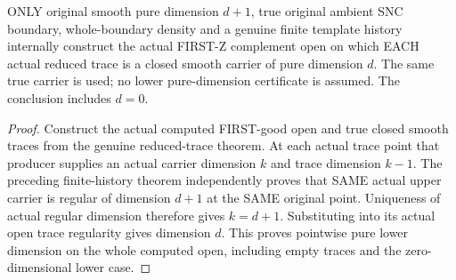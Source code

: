 \begin{theorem}
\label{hir:sharp-original-first-good-trace-pure-lower-dimension}
\leanok
ONLY original smooth pure dimension $d+1$, true original ambient SNC
boundary, whole-boundary density and a genuine finite template history
internally construct the actual FIRST-Z complement open on which EACH
actual reduced trace is a closed smooth carrier of pure dimension $d$.
The same true carrier is used; no lower pure-dimension certificate is
assumed. The conclusion includes $d=0$.
\end{theorem}
\begin{proof}
Construct the actual computed FIRST-good open and true closed smooth traces
from the genuine reduced-trace theorem. At each actual trace point that
producer supplies an actual carrier dimension $k$ and trace dimension
$k-1$. The preceding finite-history theorem independently proves that
SAME actual upper carrier is regular of dimension $d+1$ at the SAME
original point. Uniqueness of actual regular dimension therefore gives
$k=d+1$. Substituting into its actual open trace regularity gives dimension
$d$. This proves pointwise pure lower dimension on the whole computed
open, including empty traces and the zero-dimensional lower case.
\end{proof}

